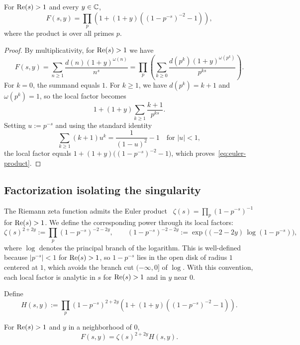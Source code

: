 \begin{lemma}\label{lem:euler-product}
For $\operatorname{Re}(s) > 1$ and every $y \in \mathbb{C}$,
\begin{equation}\label{eq:euler-product}
    F(s, y) = \prod_p \left(1 + (1+y)\left((1 - p^{-s})^{-2} - 1\right)\right),
\end{equation}
where the product is over all primes $p$.
\end{lemma}

\begin{proof}
By multiplicativity, for $\operatorname{Re}(s) > 1$ we have
\[
    F(s, y) =\sum_{n \geq 1}\frac{d(n)(1+y)^{\omega(n)}}{n^s} = \prod_p \left(\sum_{k \geq 0}
    \frac{d(p^k)(1+y)^{\omega(p^k)}}{p^{ks}}\right).
\]
For $k = 0$, the summand equals $1$. For $k \geq 1$, we have
$d(p^k) = k + 1$ and $\omega(p^k) = 1$, so the local factor becomes
\[
    1 + (1+y) \sum_{k \geq 1} \frac{k+1}{p^{ks}}.
\]
Setting $u := p^{-s}$ and using the standard identity
\[
    \sum_{k \geq 1} (k+1) u^k = \frac{1}{(1-u)^2} - 1
    \quad \text{for } |u| < 1,
\]
the local factor equals $1 + (1+y)\bigl((1-p^{-s})^{-2} - 1\bigr)$,
which proves~\eqref{eq:euler-product}.
\end{proof}

\subsection{Factorization isolating the singularity}\label{sec:factorization}

The Riemann zeta function admits the Euler product~\cite{Apostol1976}
$\zeta(s) = \prod_p (1 - p^{-s})^{-1}$ for $\operatorname{Re}(s) > 1$. We define the corresponding power through its local
factors:
\[
    \zeta(s)^{2+2y}
        := \prod_p (1 - p^{-s})^{-2-2y},
    \qquad
    (1 - p^{-s})^{-2-2y}
        := \exp\bigl((-2-2y)\,\log(1 - p^{-s})\bigr),
\]
where $\log$ denotes the principal branch of the logarithm.
This is well-defined because $|p^{-s}| < 1$ for $\operatorname{Re}(s) > 1$, so
$1 - p^{-s}$ lies in the open disk of radius $1$ centered at $1$,
which avoids the branch cut $(-\infty, 0]$ of $\log$.
With this convention, each local factor is analytic in $s$ 
for $\operatorname{Re}(s) > 1$ and in $y$ near $0$.

Define
\begin{equation}\label{eq:H-def}
    H(s, y) := \prod_p (1 - p^{-s})^{2+2y}
    \left(1 + (1+y)\left((1 - p^{-s})^{-2} - 1\right)\right).
\end{equation}

\begin{corollary}\label{thm:factorization}
For $\operatorname{Re}(s) > 1$ and $y$ in a neighborhood of $0$,
\begin{equation}\label{eq:factorization}
    F(s, y) = \zeta(s)^{2+2y} H(s, y).
\end{equation}
\end{corollary}

